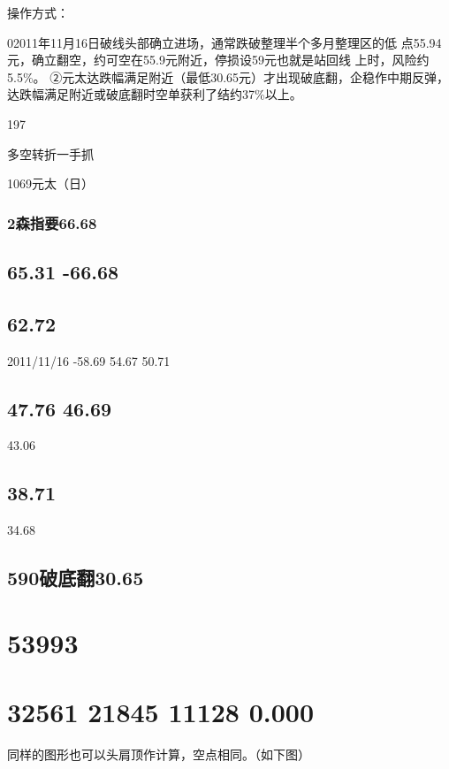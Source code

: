 \documentclass{article}
\begin{document}
操作方式：

02011年11月16日破线头部确立进场，通常跌破整理半个多月整理区的低 点55.94元，确立翻空，约可空在55.9元附近，停损设59元也就是站回线 上时，风险约5.5\%。 ②元太达跌幅满足附近（最低30.65元）才出现破底翻，企稳作中期反弹， 达跌幅满足附近或破底翻时空单获利了结约37\%以上。

197

\clearpage

多空转折一手抓

1069元太（日）

\subsubsection{2森指要66.68}

\subsection{65.31 -66.68}

\subsection{62.72}

2011/11/16 -58.69 54.67 50.71

\subsection{47.76 46.69}

43.06

\subsection{38.71}

34.68

\subsection{590破底翻30.65}

\section{53993}

\section{32561 21845 11128 0.000}

同样的图形也可以头肩顶作计算，空点相同。（如下图）
\end{document}
